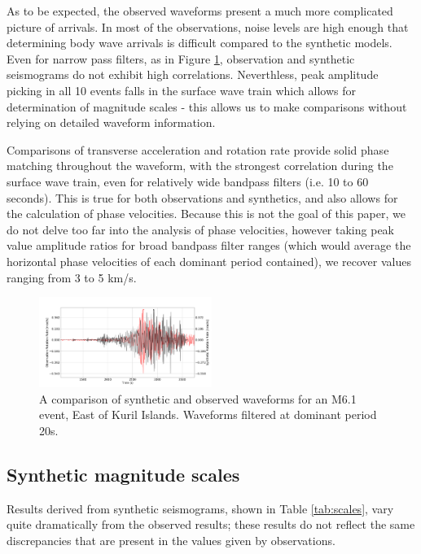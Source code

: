 \documentclass{gji}
\begin{document}

As to be expected, the observed waveforms present a much more complicated picture of arrivals. In most of the observations, noise levels are high enough that determining body wave arrivals is difficult compared to the synthetic models. Even for narrow pass filters, as in Figure \ref{fig:both}, observation and synthetic seismograms do not exhibit high correlations. Neverthless, peak amplitude picking in all 10 events falls in the surface wave train which allows for determination of magnitude scales - this allows us to make comparisons without relying on detailed waveform information.

Comparisons of transverse acceleration and rotation rate provide solid phase matching throughout the waveform, with the strongest correlation during the surface wave train, even for relatively wide bandpass filters (i.e. 10 to 60 seconds). This is true for both observations and synthetics, and also allows for the calculation of phase velocities. Because this is not the goal of this paper, we do not delve too far into the analysis of phase velocities, however taking peak value amplitude ratios for broad bandpass filter ranges (which would average the horizontal phase velocities of each dominant period contained), we recover values ranging from 3 to 5 km/s. 

\begin{figure}
\centerline{\includegraphics[width=0.5\textwidth]{C201304191958A_10-60_rotationrate_compare}}
\caption{A comparison of synthetic and observed waveforms for an M6.1 event, East of Kuril Islands. Waveforms filtered at dominant period 20s.}
\label{fig:both}
\end{figure}

\subsection{Synthetic magnitude scales}
Results derived from synthetic seismograms, shown in Table \ref{tab:scales}, vary quite dramatically from the observed results; these results do not reflect the same discrepancies that are present in the values given by observations.
\end{document}
